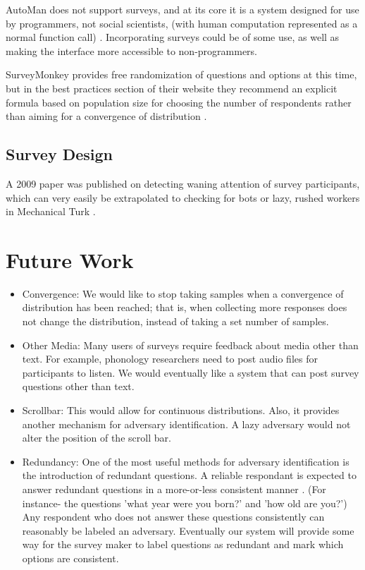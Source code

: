 \documentclass{article}
\begin{document}
AutoMan does not support surveys, and at its core it is a system designed for use by programmers, not social scientists, (with human computation represented as a normal function call) \cite{automan}. Incorporating surveys could be of some use, as well as making the interface more accessible to non-programmers.

SurveyMonkey provides free randomization of questions and options at this time, but in the best practices section of their website they recommend an explicit formula based on population size for choosing the number of respondents rather than aiming for a convergence of distribution \cite{surveymonkey_how_many}.
\subsection{Survey Design}
A 2009 paper was published on detecting waning attention of survey participants, which can very easily be extrapolated to checking for bots or lazy, rushed workers in Mechanical Turk \cite{satisficing}.
\section{Future Work}
\begin{itemize}
\item Convergence: We would like to stop taking samples when a convergence of distribution has been reached; that is, when collecting more responses does not change the distribution, instead of taking a set number of samples.
\item Other Media:  Many users of surveys require feedback about media other than text. For example, phonology researchers need to post audio files for participants to listen. We would eventually like a system that can post survey questions other than text.
\item Scrollbar: This would allow for continuous distributions. Also, it provides another mechanism for adversary identification. A lazy adversary would not alter the position of the scroll bar.
\item Redundancy: One of the most useful methods for adversary identification is the introduction of redundant questions. A reliable respondant is expected to answer redundant questions in a more-or-less consistent manner \cite{satisficing}. (For instance- the questions 'what year were you born?' and 'how old are you?') Any respondent who does not answer these questions consistently can reasonably be labeled an adversary. Eventually our system will provide some way for the survey maker to label questions as redundant and mark which options are consistent.
\end{itemize}


\end{document}
